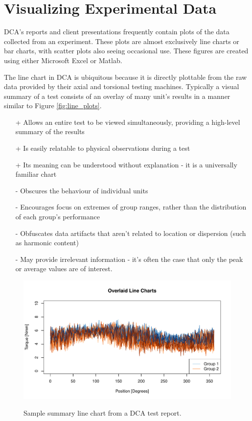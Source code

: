 \documentclass[11pt,a4paper,article]{memoir} %
\begin{document}
\section{Visualizing Experimental Data}
DCA's reports and client presentations frequently contain plots of the data collected from an experiment. These plots are almost exclusively line charts or bar charts, with scatter plots also seeing occasional use. These figures are created using either Microsoft Excel or Matlab.
\par
The line chart in DCA is ubiquitous because it is directly plottable from the raw data provided by their axial and torsional testing machines. Typically a visual summary of a test consists of an overlay of many unit's results in a manner similar to Figure \ref{fig:line_plots}. 
\begin{itemize}
\item[+] Allows an entire test to be viewed simultaneously, providing a high-level summary of the results
\item[+] Is easily relatable to physical observations during a test
\item[+] Its meaning can be understood without explanation - it is a universally familiar chart
\item[-] Obscures the behaviour of individual units
\item[-] Encourages focus on extremes of group ranges, rather than the distribution of each group's performance
\item[-] Obfuscates data artifacts that aren't related to location or dispersion (such as harmonic content)
\item[-] May provide irrelevant information - it's often the case that only the peak or average values are of interest.
\end{itemize}
\begin{figure}
	\includegraphics[width=\textwidth]{overlaid_line_charts.pdf}
	\label{line_plots}
	\caption{Sample summary line chart from a DCA test report.}
\end{figure}
\end{document}
